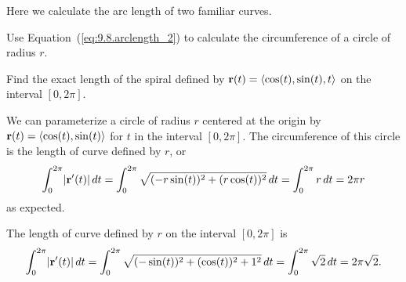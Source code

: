 \begin{activity} \label{A:9.8.1} Here we calculate the arc length of two familiar curves.
\ba
	\item Use Equation~(\ref{eq:9.8.arclength_2}) to calculate the circumference of a circle of radius $r$.
	\item Find the exact length of the spiral defined by $\mathbf{r}(t) = \langle \cos(t), \sin(t), t \rangle$ on the interval $[0,2\pi]$. 
\ea	
\end{activity}
\begin{smallhint}

\end{smallhint}
\begin{bighint}

\end{bighint}
\begin{activitySolution}
\ba
	\item We can parameterize a circle of radius $r$ centered at the origin by $\mathbf{r}(t) = \langle \cos(t), \sin(t) \rangle$ for $t$ in the interval $[0, 2\pi]$. The circumference of this circle is the length of curve defined by $r$, or
\[\int_0^{2\pi} \lvert \mathbf{r}'(t) \rvert \, dt = \int_0^{2\pi} \sqrt{(-r\sin(t))^2 + (r\cos(t))^2} \, dt = \int_0^{2\pi} r \, dt = 2 \pi r\]
as expected.
	\item The length of curve defined by $r$ on the interval $[0,2 \pi]$ is 
\[\int_0^{2\pi} \lvert \mathbf{r}'(t) \rvert \, dt = \int_0^{2\pi} \sqrt{(-\sin(t))^2 + (\cos(t))^2 + 1^2} \, dt = \int_0^{2\pi} \sqrt{2} \, dt = 2 \pi \sqrt{2}.\]
\ea
\end{activitySolution}


\aftera
